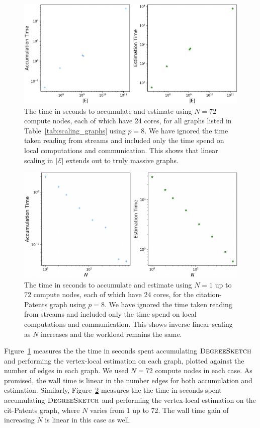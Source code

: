 \documentclass[10]{article}
\newcommand{\algoname}[1]{\textnormal{\textsc{#1}}}
\begin{document}
\begin{figure}
	\centerline{\includegraphics[width=0.8\columnwidth]{ds_scaling}}
	\caption{The time in seconds to accumulate and estimate using $N=72$ compute nodes, each of which have 24 cores, for all graphs listed in Table~\ref{tab:scaling_graphs} using $p=8$.
	We have ignored the time taken reading from streams and included only the time spend on local computations and communication.
	This shows that linear scaling in $|\mathcal{E}|$ extends out to truly massive graphs.
	\label{fig:ds_scaling}}
\end{figure}

\begin{figure}
	\centerline{\includegraphics[width=0.8\columnwidth]{patents_scaling}}
	\caption{The time in seconds to accumulate and estimate using $N=1$ up to $72$ compute nodes, each of which have 24 cores, for the citation-Patents graph using $p=8$.
	We have ignored the time taken reading from streams and included only the time spend on local computations and communication.
	This shows inverse linear scaling as $N$ increases and the workload remains the same.
	\label{fig:patents_scaling}}
\end{figure}

Figure~\ref{fig:ds_scaling} measures the the time in seconds spent accumulating $\algoname{DegreeSketch}$ and performing the vertex-local estimation on each graph, plotted against the number of edges in each graph. 
We used $N=72$ compute nodes in each case. 
As promised, the wall time is linear in the number edges for both accumulation and estimation.
Similarly, Figure~\ref{fig:patents_scaling} measures the the time in seconds spent accumulating $\algoname{DegreeSketch}$ and performing the vertex-local estimation on the cit-Patents graph, where $N$ varies from 1 up to 72. 
The wall time gain of increasing $N$ is linear in this case as well. 
\end{document}
